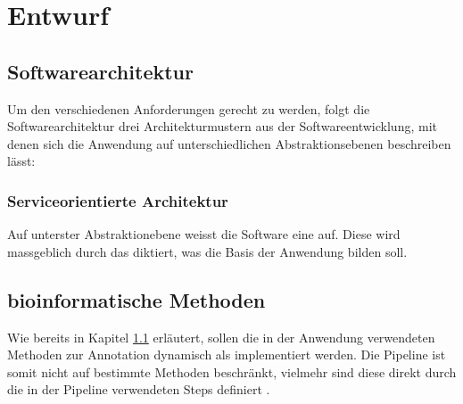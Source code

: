 \chapter{Entwurf}

\section{Softwarearchitektur}\label{chp:softwarearchitektur}
Um den verschiedenen Anforderungen gerecht zu werden,
folgt die Softwarearchitektur drei Architekturmustern
aus der
Softwareentwicklung, mit denen sich die Anwendung auf unterschiedlichen
Abstraktionsebenen beschreiben lässt:
\citep{buschmann_pattern-oriented_1996}




\subsection{Serviceorientierte Architektur}
Auf unterster Abstraktionebene weisst die Software eine
 auf.
Diese wird massgeblich durch das  diktiert, was die Basis
der Anwendung bilden soll.



\section{bioinformatische Methoden}
Wie bereits in Kapitel \ref{chp:softwarearchitektur} erläutert, sollen die in
der Anwendung verwendeten Methoden zur Annotation dynamisch als 
implementiert werden. Die Pipeline ist somit nicht auf bestimmte Methoden
beschränkt, vielmehr sind diese direkt durch die in der Pipeline verwendeten
Steps definiert .

